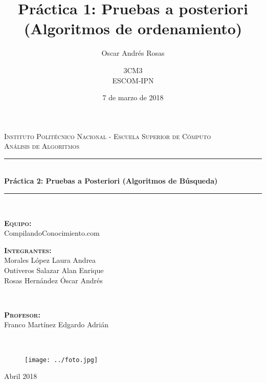 \documentclass[12pt, fleqn]{report}                             %
\author{Oscar Andrés Rosas}                                     %
\title{Práctica 1: Pruebas a posteriori (Algoritmos de ordenamiento)}
\author{3CM3\\
    	ESCOM-IPN}
\date{7 de marzo de 2018}
\theoremstyle{break}                                            %
\begin{document}
\lstset{inputencoding=utf8/latin1}

\begin{titlepage}

    \center
    \textsc{\Large Instituto Politécnico Nacional - Escuela Superior de Cómputo}\\[0.5cm] 
    \textsc{\large Análisis de Algoritmos}\\[1.5cm]

    \rule{\linewidth}{0.5mm} \\[1.0cm]
        { \huge \bfseries Práctica 2: Pruebas a Posteriori (Algoritmos de Búsqueda)}\\[1.0cm] 
    \rule{\linewidth}{0.5mm} \\[2.0cm]
     
    \begin{minipage}{0.4\textwidth}
        \begin{flushleft} \large

            \textbf{\textsc{Equipo:}}       \\
            CompilandoConocimiento.com

            \textbf{\textsc{Integrantes:}}  \\
            Morales López Laura Andrea      \\
            Ontiveros Salazar Alan Enrique  \\
            Rosas Hernández Óscar Andrés
        \end{flushleft}
    \end{minipage}
    ~
    \begin{minipage}{0.4\textwidth}
        \begin{flushright} \large
            \textbf{\textsc{Profesor: }}\\
            Franco Martínez Edgardo Adrián
        \end{flushright}
    \end{minipage}\\[3,5cm]

    \begin{figure}[H]
        \centering
        \texttt{[image: ../foto.jpg]}
    \end{figure}
    
    
    {\large Abril 2018}\\[2cm] 

    \vfill

\end{titlepage}
\end{document}
